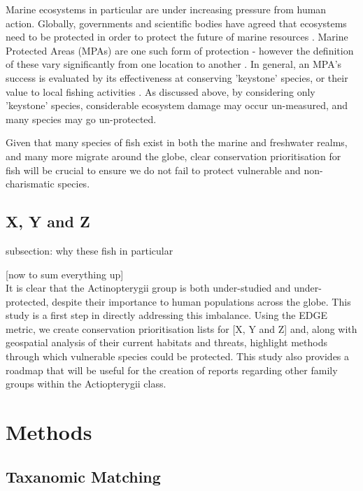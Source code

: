 \documentclass[11pt]{article}
\begin{document}
Marine ecosystems in particular are under increasing pressure from human 
action. Globally, governments and scientific bodies have agreed that ecosystems 
need to be protected in order to protect the future of marine resources 
\autocite{MurakiGottlieb2018}. Marine Protected Areas (MPAs) are one such form 
of 
protection - 
however the definition of these vary significantly from one location to 
another \autocite{Marinesque2012}. In general, an MPA's success is evaluated by 
its effectiveness at conserving 'keystone' species, or their value to local 
fishing activities \autocite{Marinesque2012}. As discussed above, by 
considering only 'keystone' species, considerable ecosystem damage may occur 
un-measured, and many species may go un-protected. 

Given that many species of fish 
exist in both the marine and freshwater realms, and many more migrate around 
the globe, clear conservation prioritisation for fish will be crucial to ensure 
we do not fail to protect vulnerable and non-charismatic species. 


\subsection{X, Y  and Z}
subsection: why these fish in particular



[now to sum everything up] \\

It is clear that the Actinopterygii group is both under-studied and 
under-protected, despite their importance to human populations across the 
globe. This study is a first step in directly addressing this imbalance. Using 
the EDGE metric, we create conservation prioritisation lists for [X, Y and Z] 
and, along with geospatial analysis of their current habitats and threats, 
highlight methods through which vulnerable species could be protected. This 
study also provides a roadmap that will be useful for the creation of reports 
regarding other family groups within the Actiopterygii class.  





	\section{Methods}
	\noindent

\subsection{Taxanomic Matching}
\end{document}
